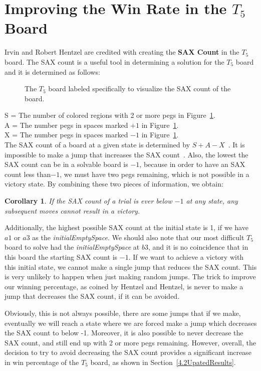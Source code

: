 \documentclass{article}
\newtheorem*{corollary}{Corollary}
\newcommand\tab[1][.5cm]{\hspace*{#1}}
\begin{document}
\section{Improving the Win Rate in the $T_5$ Board}
\label{4SAX}

Irvin and Robert Hentzel are credited with creating the \textbf{SAX Count} in the $T_5$ board. The SAX count is a useful tool in determining a solution for the $T_5$ board and it is determined as follows:\\

\begin{figure}[htb]
\centering
{}
\caption{The $T_5$ board labeled specifically to visualize the SAX count of the board.}
\label{fig9}
\end{figure}

\large S = The number of colored regions with 2 or more pegs in Figure~\ref{fig9}.\\
\tab\large A = The number pegs in spaces marked $+1$ in Figure~\ref{fig9}.\\
\tab\large X =  The number pegs in spaces marked $-1$ in Figure~\ref{fig9}.\\

\normalsize The SAX count of a board at a given state is determined by $S+A-X$~\cite{Hentzel}. It is impossible to make a jump that increases the SAX count~\cite{Bell}. Also, the lowest the SAX count can be in a solvable board is $-1$, because in order to have an SAX count less than$-1$, we must have two pegs remaining, which is not possible in a victory state. By combining these two pieces of information, we obtain:
\begin{corollary}
If the SAX count of a trial is ever below $-1$ at any state, any subsequent moves cannot result in a victory.
\end{corollary} 
Additionally, the highest possible SAX count at the initial state is 1, if we have $a1$ or $a3$ as the \textit{initialEmptySpace}. We should also note that our most difficult $T_5$ board to solve had the \textit{initialEmptySpace} at $b3$, and it is no coincidence that in this board the starting SAX count is $-1$. If we want to achieve a victory with this initial state, we cannot make a single jump that reduces the SAX count. This is very unlikely to happen when just making random jumps. The trick to improve our winning percentage, as coined by Hentzel and Hentzel, is never to make a jump that decreases the SAX count, if it can be avoided.

Obviously, this is not always possible, there are some jumps that if we make, eventually we will reach a state where we are forced make a jump which decreases the SAX count to below -1. Moreover, it is also possible to never decrease the SAX count, and still end up with 2 or more pegs remaining. However, overall, the decision to try to avoid decreasing the SAX count provides a significant increase in win percentage of the $T_5$ board, as shown in Section~\ref{4.2UpatedResults}. 
\end{document}
